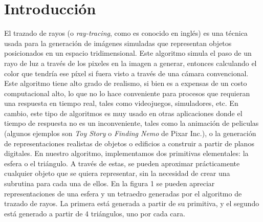 \section{Introducción}

El trazado de rayos (o \emph{ray-tracing}, como es conocido en inglés) es una técnica usada para la generación de imágenes simuladas que representan objetos posicionados en un espacio tridimensional. Este algoritmo simula el paso de un rayo de luz a través de los pixeles en la imagen a generar, entonces calculando el color que tendría ese píxel si fuera visto a través de una cámara convencional. Este algoritmo tiene alto grado de realismo, si bien es a expensas de un costo computacional alto, lo que no lo hace conveniente para procesos que requieran una respuesta en tiempo real, tales como videojuegos, simuladores, etc. En cambio, este tipo de algoritmos es muy usado en otras aplicaciones donde el tiempo de respuesta no es un inconveniente, tales como la animación de peliculas (algunos ejemplos son \emph{Toy Story} o \emph{Finding Nemo} de Pixar Inc.), o la generación de representaciones realistas de objetos o edificios a construir a partir de planos digitales.
En nuestro algoritmo, implementamos dos primitivas elementales: la esfera o el triángulo. A través de estas, se pueden aproximar prácticamente cualquier objeto que se quiera representar, sin la necesidad de crear una subrutina para cada una de ellos. En la figura 1 se pueden apreciar representaciones de una esfera y un tetraedro generadas por el algoritmo de trazado de rayos. La primera está generada a partir de su primitiva, y el segundo está generado a partir de 4 triángulos, uno por cada cara.\\

